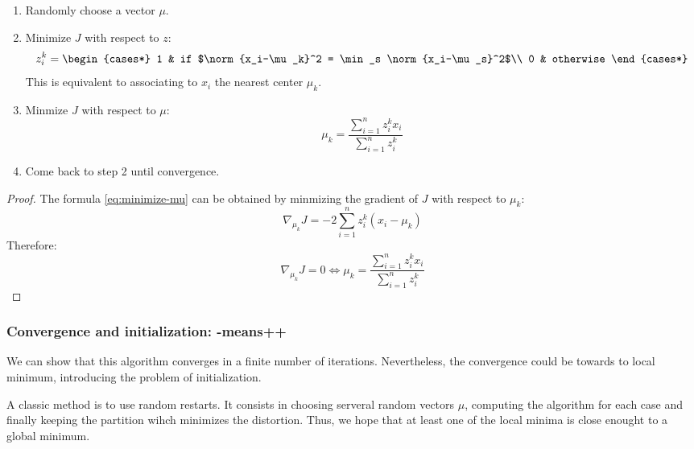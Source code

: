\documentclass[toc, titlepaged]{../cs-classes/cs-classes}
\begin{document}
\begin{enumerate}
    \item Randomly choose a vector $\mu$.
    \item Minimize $J$ with respect to $z$:
    \begin{equation}
        z_i^k = \begin{cases*}
            1 & if $\norm{x_i-\mu_k}^2 = \min_s \norm{x_i-\mu_s}^2$\\
            0 & otherwise
        \end{cases*}
    \end{equation}
    This is equivalent to associating to $x_i$ the nearest center $\mu_k$.
    \item Minmize $J$ with respect to $\mu$:
    \begin{equation}
        \label{eq:minimize-mu}
        \mu_k = \frac{\sum_{i=1}^n z_i^k x_i}{\sum_{i=1}^n z_i^k}
    \end{equation}
    \item Come back to step 2 until convergence.
\end{enumerate}

\begin{proof}
    The formula \eqref{eq:minimize-mu} can be obtained by minmizing the gradient of $J$ with respect to $\mu_k$:
    \begin{equation*}
        \nabla_{\mu_k} J = -2 \sum_{i=1}^n z_i^k (x_i-\mu_k)
    \end{equation*}
    Therefore:
    \begin{equation*}
        \nabla_{\mu_k} J = 0 \iff \mu_k = \frac{\sum_{i=1}^n z_i^k x_i}{\sum_{i=1}^n z_i^k}
    \end{equation*}
\end{proof}

\subsubsection{Convergence and initialization: -means++}
We can show that this algorithm converges in a finite number of iterations. Nevertheless, the convergence could be towards to local minimum, introducing the problem of initialization.

A classic method is to use random restarts. It consists in choosing serveral random vectors $\mu$, computing the algorithm for each case and finally keeping the partition wihch minimizes the distortion. Thus, we hope that at least one of the local minima is close enought to a global minimum.
\end{document}

